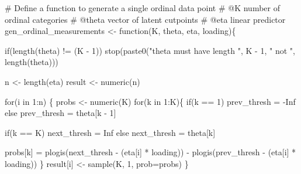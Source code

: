 \documentclass[
  letterpaper,
  DIV=11,
  numbers=noendperiod]{scrreprt}
\newenvironment{Shaded}{\begin{snugshade}}{\end{snugshade}}
\newcommand{\AttributeTok}[1]{\textcolor[rgb]{0.40,0.45,0.13}{#1}}
\newcommand{\CommentTok}[1]{\textcolor[rgb]{0.37,0.37,0.37}{#1}}
\newcommand{\ConstantTok}[1]{\textcolor[rgb]{0.56,0.35,0.01}{#1}}
\newcommand{\ControlFlowTok}[1]{\textcolor[rgb]{0.00,0.23,0.31}{#1}}
\newcommand{\DecValTok}[1]{\textcolor[rgb]{0.68,0.00,0.00}{#1}}
\newcommand{\FunctionTok}[1]{\textcolor[rgb]{0.28,0.35,0.67}{#1}}
\newcommand{\NormalTok}[1]{\textcolor[rgb]{0.00,0.23,0.31}{#1}}
\newcommand{\OtherTok}[1]{\textcolor[rgb]{0.00,0.23,0.31}{#1}}
\newcommand{\SpecialCharTok}[1]{\textcolor[rgb]{0.37,0.37,0.37}{#1}}
\newcommand{\StringTok}[1]{\textcolor[rgb]{0.13,0.47,0.30}{#1}}
\begin{document}
\begin{Shaded}
\begin{Highlighting}[]
\CommentTok{\# Define a function to generate a single ordinal data point}
\CommentTok{\# @K number of ordinal categories}
\CommentTok{\# @theta vector of latent cutpoints}
\CommentTok{\# @eta linear predictor}
\NormalTok{gen\_ordinal\_measurements }\OtherTok{\textless{}{-}} \ControlFlowTok{function}\NormalTok{(K, theta, eta, loading)\{}

   \ControlFlowTok{if}\NormalTok{(}\FunctionTok{length}\NormalTok{(theta) }\SpecialCharTok{!=}\NormalTok{ (K }\SpecialCharTok{{-}} \DecValTok{1}\NormalTok{))}
        \FunctionTok{stop}\NormalTok{(}\FunctionTok{paste0}\NormalTok{(}\StringTok{"theta must have length "}\NormalTok{, K }\SpecialCharTok{{-}} \DecValTok{1}\NormalTok{, }\StringTok{" not "}\NormalTok{, }\FunctionTok{length}\NormalTok{(theta)))}

\NormalTok{   n }\OtherTok{\textless{}{-}} \FunctionTok{length}\NormalTok{(eta)}
\NormalTok{   result }\OtherTok{\textless{}{-}} \FunctionTok{numeric}\NormalTok{(n)}

   \ControlFlowTok{for}\NormalTok{(i }\ControlFlowTok{in} \DecValTok{1}\SpecialCharTok{:}\NormalTok{n) \{}
\NormalTok{       probs }\OtherTok{\textless{}{-}} \FunctionTok{numeric}\NormalTok{(K)}
       \ControlFlowTok{for}\NormalTok{(k }\ControlFlowTok{in} \DecValTok{1}\SpecialCharTok{:}\NormalTok{K)\{}
           \ControlFlowTok{if}\NormalTok{(k }\SpecialCharTok{==} \DecValTok{1}\NormalTok{) prev\_thresh }\OtherTok{=} \SpecialCharTok{{-}}\ConstantTok{Inf}
           \ControlFlowTok{else}\NormalTok{ prev\_thresh }\OtherTok{=}\NormalTok{ theta[k }\SpecialCharTok{{-}} \DecValTok{1}\NormalTok{]}

           \ControlFlowTok{if}\NormalTok{(k }\SpecialCharTok{==}\NormalTok{ K) next\_thresh }\OtherTok{=} \ConstantTok{Inf}
           \ControlFlowTok{else}\NormalTok{ next\_thresh }\OtherTok{=}\NormalTok{ theta[k]}

\NormalTok{           probs[k] }\OtherTok{=} \FunctionTok{plogis}\NormalTok{(next\_thresh }\SpecialCharTok{{-}}\NormalTok{ (eta[i] }\SpecialCharTok{*}\NormalTok{ loading)) }\SpecialCharTok{{-}} \FunctionTok{plogis}\NormalTok{(prev\_thresh }\SpecialCharTok{{-}}\NormalTok{ (eta[i] }\SpecialCharTok{*}\NormalTok{ loading))}
\NormalTok{       \}}
\NormalTok{       result[i] }\OtherTok{\textless{}{-}} \FunctionTok{sample}\NormalTok{(K, }\DecValTok{1}\NormalTok{, }\AttributeTok{prob=}\NormalTok{probs)}
\NormalTok{   \}}
  

\end{Highlighting}
\end{Shaded}
\end{document}
